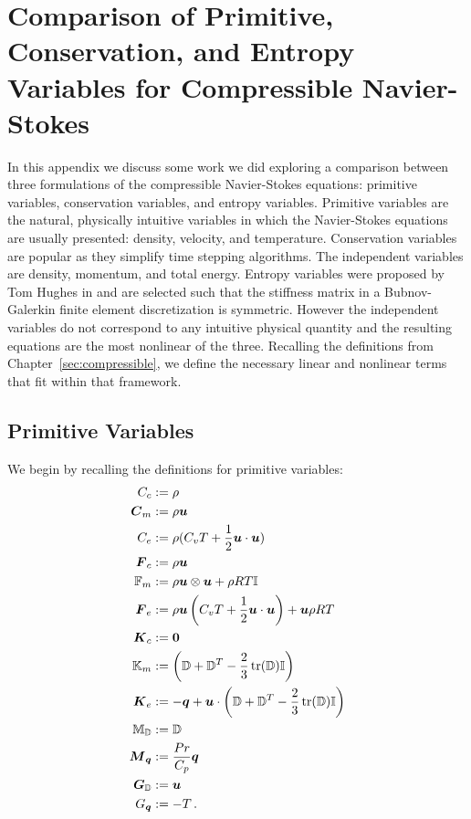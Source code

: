 \documentclass[Dissertation.tex]{subfiles}
\begin{document}
\graphicspath{{../Figures/}}
\chapter{Comparison of Primitive, Conservation, and Entropy Variables for Compressible Navier-Stokes}
\label{sec:VariableComparison}
In this appendix we discuss some work we did exploring a comparison between three formulations of the 
compressible Navier-Stokes equations: primitive variables, conservation variables, and entropy variables.
Primitive variables are the natural, physically intuitive variables in which the Navier-Stokes 
equations are usually presented: density, velocity, and temperature.
Conservation variables are popular as they simplify time stepping algorithms. 
The independent variables are density, momentum, and total energy.
Entropy variables were proposed by Tom Hughes in \cite{HughesEntropyVariables}
and are selected such that the stiffness matrix in a Bubnov-Galerkin finite element 
discretization is symmetric. 
However the independent variables do not correspond to any intuitive physical quantity
and the resulting equations are the most nonlinear of the three.
Recalling the definitions from Chapter~\ref{sec:compressible}, we define the necessary
linear and nonlinear terms that fit within that framework.

\section{Primitive Variables}
We begin by recalling the definitions for primitive variables:
\begin{align*}
C_c&:=\rho\\
\boldsymbol C_m&:=\rho\boldsymbol u\\
C_e&:=\rho(C_v T+\frac{1}{2}\boldsymbol u\cdot\boldsymbol u)\\
\boldsymbol F_c&:=\rho\boldsymbol u\\
\mathbb{F}_m&:=\rho\boldsymbol u\otimes\boldsymbol u+\rho RT\mathbb{I}\\
\boldsymbol F_e&:=\rho\boldsymbol u\left( C_v T+\frac{1}{2}\boldsymbol u\cdot\boldsymbol u \right)+\boldsymbol u\rho RT\\
\boldsymbol K_c&:=\boldsymbol 0\\
\mathbb{K}_m&:=\left( \mathbb{D}+\mathbb{D}^T-\frac{2}{3}\operatorname*{tr}(\mathbb{D})\mathbb{I} \right)\\
\boldsymbol K_e&:=-\boldsymbol q+\boldsymbol u\cdot\left( \mathbb{D}+\mathbb{D}^T-\frac{2}{3}\operatorname*{tr}(\mathbb{D})\mathbb{I} \right)\\
\mathbb{M}_{\mathbb{D}}&:=\mathbb{D}\\
\boldsymbol M_{\boldsymbol q}&:=\frac{Pr}{C_p}\boldsymbol q\\
\boldsymbol G_{\mathbb{D}}&:=\boldsymbol u\\
G_{\boldsymbol q}&:=-T\,.
\end{align*}
\end{document}
